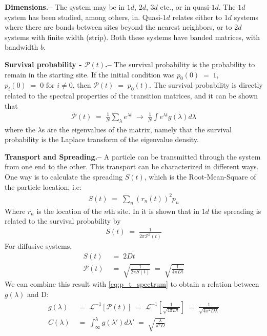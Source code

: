 \documentclass[onecolumn,fleqn,notitlepage,secnumarabic]{revtex4}
\begin{document}
{ \bf Dimensions.-- } The system may be in $1d$, $2d$, $3d$ etc., or in quasi-$1d$. The $1d$ system has been studied, among others, in\cite{Parris:1986}\cite{Alexander:1981:RMP}\cite{AslangulChvosta:1995}.  Quasi-$1d$ relates either to $1d$ systems where there are bonds between sites beyond the nearest neighbors, or to $2d$ systems with finite width (strip). Both these systems have banded matrices, with bandwidth $b$.

{ \bf Survival probability - $\mathcal{P}(t)$.--} 
The survival probability is the probability to remain in the starting site. If the initial condition was $p_0(0)\;=\;1$, $p_i(0)\;=\;0 \textrm{  for  } i\neq 0$, then $\mathcal{P}(t)\;=\; p_0(t)$. The survival probability is directly related to the spectral properties of the transition matrices, and it can be shown that 
\begin{align} \label{eq:p_t_spectrum}
\mathcal{P}(t) \;=\; \frac{1}{N}\sum_\lambda e^{\lambda t} \;\rightarrow\;\frac{1}{N}\int e^{\lambda t}g(\lambda)d\lambda
\end{align}
where the $\lambda$s are the eigenvalues of the matrix, namely that the survival probability is the Laplace transform of the eigenvalue density.

{ \bf Transport and Spreading.--}  %
A particle can be transmitted through the system from one end to the other. This transport can be characterized in different ways. One way is to calculate the spreading $S(t)$, which is the Root-Mean-Square of the particle location, i.e:
\begin{align}
  S(t) \;=\; \sum_n (r_n(t)  )^2 p_n  %
\end{align}
Where $r_n$ is the location of the $n$th site. In \cite{Alexander:1981:RMP} it is shown that in $1d$ the spreading is related to the survival probability by
\begin{align}
S(t) \;=\; \frac{1}{2\pi\mathcal{P}^2(t)}
\end{align}
For diffusive systems, 
\begin{align}
S(t) &\;=\; 2Dt  \\
\mathcal{P}(t) &\;=\; \sqrt{\frac{1}{2\pi S(t)}} \;=\; \sqrt{\frac{1}{4\pi D t}}
\end{align}
We can combine this result with \eqref{eq:p_t_spectrum} to obtain a relation between $g(\lambda)$ and D:
\begin{align}
    g(\lambda) &\;=\; \mathcal{L}^{-1}[\mathcal{P}(t)] \;=\; \mathcal{L}^{-1}\left[\frac{1}{\sqrt{4\pi D t}}\right] \;=\; \frac{1}{\sqrt{4\pi^2 D\lambda}} \\
    C(\lambda) &\;=\; \int_{\infty}^{\lambda} g(\lambda')d\lambda' \;=\; \sqrt{\frac{\lambda}{\pi^2 D}} \label{eq:C_D}
\end{align}
\end{document}
